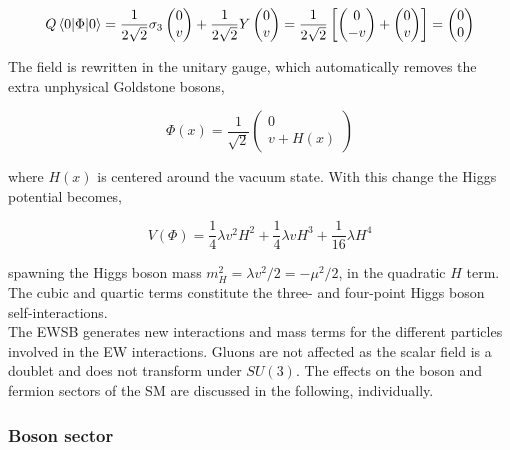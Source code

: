 \begin{equation}
    Q\expval{\Phi}{0} = \frac{1}{2\sqrt{2}}\sigma_3\begin{pmatrix}0\\v\end{pmatrix}+\frac{1}{2\sqrt{2}}Y\begin{pmatrix}0\\v\end{pmatrix} = \frac{1}{2\sqrt{2}}\left[ 
    \begin{pmatrix} 0 \\ -v  \end{pmatrix} +
    \begin{pmatrix} 0 \\ v  \end{pmatrix}\right] = \begin{pmatrix}
    0\\0
    \end{pmatrix}
\end{equation}

The field is rewritten in the unitary gauge, which automatically removes the extra unphysical Goldstone bosons,

\begin{equation}
    \Phi(x) = \frac{1}{\sqrt{2}}\begin{pmatrix}
    0 \\ v+H(x)
    \end{pmatrix}
\end{equation}

where $H(x)$ is centered around the vacuum state. With this change the Higgs potential becomes,

\begin{equation}
    V(\Phi) =\frac{1}{4}\lambda v^2 H^2 + \frac{1}{4} \lambda v H^3 + \frac{1}{16} \lambda H^4
\end{equation}

spawning the Higgs boson mass $m_H^2=\lambda v^2/2 = -\mu^2/2$, in the quadratic $H$ term. The cubic and quartic terms constitute the three- and four-point Higgs boson self-interactions.\\

The EWSB generates new interactions and mass terms for the different particles involved in the EW interactions. Gluons are not affected as the scalar field is a doublet and does not transform under $SU(3)$. The effects on the boson and fermion sectors of the SM are discussed in the following, individually. 

\subsubsection{Boson sector}

